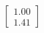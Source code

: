 \documentclass[preview]{standalone}
\begin{document}
\begin{align*}
\begin{bmatrix} 1.00 \\ 1.41 \end{bmatrix}
\end{align*}
\end{document}
